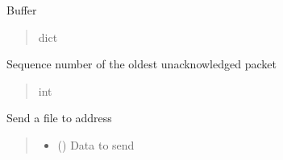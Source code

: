 \documentclass[letterpaper,10pt,english]{sphinxmanual}
\begin{document}
\begin{fulllineitems}
\begin{fulllineitems}
\begin{quote}
\begin{description}
\end{description}\end{quote}

\end{fulllineitems}


\begin{fulllineitems}
\label{\detokenize{sender:sender.Sender.window}}
\pysigstartsignatures
\pysigline
{}
\pysigstopsignatures
\sphinxAtStartPar
Buffer
\begin{quote}\begin{description}
\sphinxAtStartPar
dict

\end{description}\end{quote}

\end{fulllineitems}


\begin{fulllineitems}
\label{\detokenize{sender:sender.Sender.base}}
\pysigstartsignatures
\pysigline
{}
\pysigstopsignatures
\sphinxAtStartPar
Sequence number of the oldest unacknowledged packet
\begin{quote}\begin{description}
\sphinxAtStartPar
int

\end{description}\end{quote}

\end{fulllineitems}


\begin{fulllineitems}
\label{\detokenize{sender:sender.Sender.send_file}}
\pysigstartsignatures
\pysiglinewithargsret
{}
{\sphinxparamcomma {}}
{}
\pysigstopsignatures
\sphinxAtStartPar
Send a file to address
\begin{quote}\begin{description}
\begin{itemize}
\item {} 
\sphinxAtStartPar
{} () \textendash{} Data to send


\end{itemize}
\end{description}
\end{quote}
\end{fulllineitems}
\end{fulllineitems}
\end{document}
